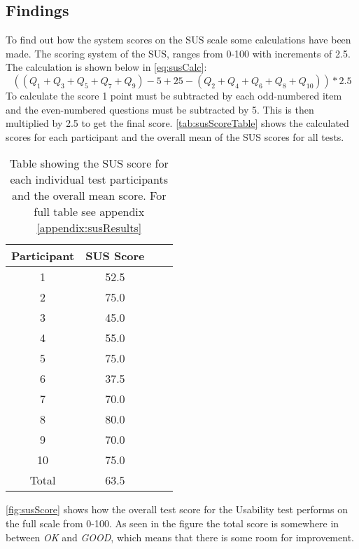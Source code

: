 \subsection{Findings}
To find out how the system scores on the SUS scale some calculations have been made. The scoring system of the SUS, ranges from 0-100 with increments of 2.5. The calculation is shown below in \autoref{eq:susCalc}:
\begin{equation} \label{eq:susCalc}
( (Q_1+Q_3+Q_5+Q_7+Q_9)-5+25-(Q_2+Q_4+Q_6+Q_8+Q_{10}) )*2.5
\end{equation}
\linebreak
To calculate the score 1 point must be subtracted by each odd-numbered item and the even-numbered questions must be subtracted by 5. This is then multiplied by 2.5 to get the final score. \autoref{tab:susScoreTable} shows the calculated scores for each participant and the overall mean of the SUS scores for all tests.

\begin{table}[H]
	\centering
	\caption{Table showing the SUS score for each individual test participants and the overall mean score. For full table see appendix \ref{appendix:susResults}}
	\label{tab:susScoreTable}
	\begin{tabular}{|c|c|l|l|}
		\hline
		Participant & SUS Score \\ \hline
		1           & 52.5      \\ \hline
		2           & 75.0      \\ \hline
		3           & 45.0      \\ \hline
		4           & 55.0      \\ \hline
		5           & 75.0      \\ \hline
		6           & 37.5      \\ \hline
		7           & 70.0      \\ \hline
		8           & 80.0      \\ \hline
		9           & 70.0      \\ \hline
		10          & 75.0      \\ \hline
		Total       & 63.5      \\ \hline
	\end{tabular}
\end{table}

\autoref{fig:susScore} shows how the overall test score for the Usability test performs on the full scale from 0-100. As seen in the figure the total score is somewhere in between \textit{OK} and \textit{GOOD}, which means that there is some room for improvement.


